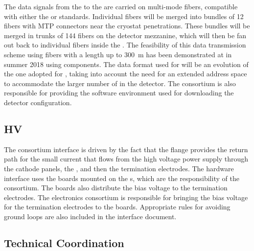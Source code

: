 The data signals from the  to the  are carried on
multi-mode fibers, compatible with either the  or  standards. Individual
fibers will be merged into bundles of 12 fibers with MTP connectors near the 
 cryostat penetrations. These bundles will be merged in trunks of 144 
fibers on the detector mezzanine, which will then be fan out back to individual
fibers inside the . The
feasibility of this data transmission scheme using fibers with a length up
to \SI{300}{m} has been demonstrated at  in summer 2018 using 
 components. The data format used for 
 will be an evolution of the one adopted for
, taking into account the need for an 
extended address space to accommodate the larger number of
 in the detector. The  consortium
is also responsible for providing the software environment
used for downloading the detector configuration.

\subsection{HV}
\label{sec:fdsp-tpcelec-interfaces-hv}

The  consortium interface 
is driven by the fact that the  flange provides the return path for
the small current that flows from the high voltage power 
supply through the cathode panels, the , and then
the termination electrodes. The hardware interface uses
the  boards mounted on the s, which
are  the responsibility of the  consortium. The
 boards also distribute the bias voltage to the 
 termination electrodes. The  electronics 
consortium is responsible for bringing the bias voltage for the 
 termination electrodes to the  boards. Appropriate
rules for avoiding ground loops are also included in the 
interface document.

\subsection{Technical Coordination}
\label{sec:fdsp-tpcelec-interfaces-tc}


